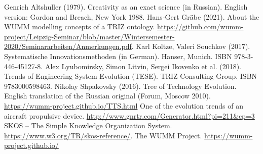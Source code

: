 \documentclass[11pt,a4paper]{article}
\begin{document}
\begin{thebibliography}{xxx}
\raggedright
{} Genrich Altshuller (1979).  Creativity as an exact
  science (in Russian). English version: Gordon and Breach, New York 1988.
 Hans-Gert Gr\"abe (2021). About the WUMM modelling
  concepts of a TRIZ ontology.  \url{https://github.com/wumm-project/Leipzig-Seminar/blob/master/Wintersemester-2020/Seminararbeiten/Anmerkungen.pdf}.
 Karl Koltze, Valeri Souchkov (2017).  Systematische
  Innovationsmethoden (in German).  Hanser, Munich. ISBN 978-3-446-45127-8.
 Alex Lyubomirsky, Simon Litvin, Sergei Ikovenko et al.
  (2018). Trends of Engineering System Evolution (TESE).  TRIZ Consulting
  Group. ISBN 9783000598463.
 Nikolay Shpakovsky (2016). Tree of Technology
  Evolution. English translation of the Russian original (Forum, Moscow
  2010).\\ \url{https://wumm-project.github.io/TTS.html}
 One of the evolution trends of an aircraft propulsive device. \url{http://www.gnrtr.com/Generator.html?pi=211&cp=3}
 SKOS -- The Simple Knowledge Organization System.
  \url{https://www.w3.org/TR/skos-reference/}.  
 The WUMM Project. \url{https://wumm-project.github.io/} 
\end{thebibliography}
\end{document}
